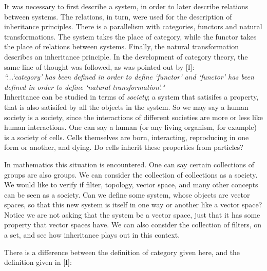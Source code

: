 \documentclass [12pt]{book}
\begin{document}
It was necessary to first describe a system, in order to later describe relations between systems. The relations, in turn, were used for the description of inheritance principles. There is a parallelism with categories, functors and natural transformations. The system takes the place of category, while the functor takes the place of relations between systems. Finally, the natural transformation describes an inheritance principle. In the development of category theory, the same line of thought was followed, as was pointed out by [I]:\\

\textit{\indent``...`category' has been defined in order to define `functor' and `functor' has been defined \indent\indent in order to define `natural transformation'."}\\

Inheritance can be studied in terms of \textit{society}; a system that satisifes a property, that is also satisifed by all the objects in the system. So we may say a human society is a society, since the interactions of different societies are more or less like human interactions. One can say a human (or any living organism, for example) is a society of cells. Cells themselves are born, interacting, reproducing in one form or another, and dying. Do cells inherit these properties from particles?

In mathematics this situation is encountered. One can say certain collections of groups are also groups. We can consider the collection of collections as a society. We would like to verify if filter, topology, vector space, and many other concepts can be seen as a society. Can we define some system, whose objects are vector spaces, so that this new system is itself in one way or another like a vector space? Notice we are not asking that the system be a vector space, just that it has some property that vector spaces have. We can also consider the collection of filters, on a set, and see how inheritance plays out in this context. 

There is a difference between the definition of category given here, and the definition given in [I]:
\end{document}

